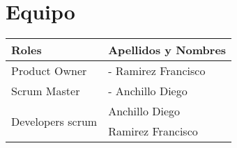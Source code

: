 \chapter{Equipo}

\begin{table}[htbp]
	\begin{center}
		\begin{tabular}{| p{5.2cm}| p{5.2cm} |}
			\hline
			\textbf{Roles} & \textbf {Apellidos y Nombres}\\\hline
			Product Owner & - Ramirez Francisco \\\hline
			Scrum Master & - Anchillo Diego \\\hline
			\multirow{2}{1cm}{Developers scrum} & Anchillo Diego \\	& Ramirez Francisco \\ \hline
		\end{tabular}
	\end{center}
\end{table}